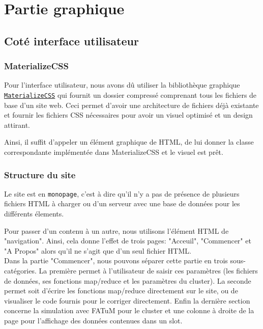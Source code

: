 \section{Partie graphique}


\subsection{Coté interface utilisateur}
\subsubsection{MaterializeCSS}
Pour l'interface utilisateur, nous avons dû utiliser la bibliothèque graphique \href{http://www.materializecss.com/}{{\tt MaterializeCSS}} qui fournit un dossier compressé comprenant tous les fichiers de base d'un site web. Ceci permet d'avoir une architecture de fichiers déjà existante et fournir les fichiers CSS nécessaires pour avoir un visuel optimisé et un design attirant.

Ainsi, il suffit d'appeler un élément graphique de HTML, de lui donner la classe correspondante implémentée dans MaterializeCSS et le visuel est prêt.

\subsubsection{Structure du site}

Le site est en {\tt monopage}, c'est à dire qu'il n'y a pas de présence de plusieurs fichiers HTML à charger ou d'un serveur avec une base de données pour les différents élements.

Pour passer d'un contenu à un autre, nous utilisons l'élément HTML de "navigation". Ainsi, cela donne l'effet de trois pages: "Acceuil", "Commencer" et "A Propos" alors qu'il ne s'agit que d'un seul fichier HTML.\\

Dans la partie "Commencer", nous pouvons séparer cette partie en trois sous-catégories. La première permet à l'utilisateur de saisir ces paramètres (les fichiers de données, ses fonctions map/reduce et les paramètres du cluster).
La seconde permet soit d'écrire les fonctions map/reduce directement sur le site, ou de visualiser le code fournis pour le corriger directement.
Enfin la dernière section concerne la simulation avec FATuM pour le cluster et une colonne à droite de la page pour l'affichage des données contenues dans un slot.

